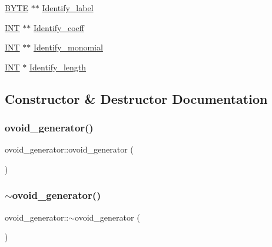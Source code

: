 \begin{DoxyCompactItemize}
\item 
\mbox{\hyperlink{galois_8h_ab6cc7b4aeb6ea31aba2b3fbfc83ff5e6}{B\+Y\+TE}} $\ast$$\ast$ \mbox{\hyperlink{classovoid__generator_aa6f6781633bb6e8a7113528d3408500d}{Identify\+\_\+label}}
\item 
\mbox{\hyperlink{galois_8h_a09fddde158a3a20bd2dcadb609de11dc}{I\+NT}} $\ast$$\ast$ \mbox{\hyperlink{classovoid__generator_a4db18ba0a00ae839f161478f60e8a7d4}{Identify\+\_\+coeff}}
\item 
\mbox{\hyperlink{galois_8h_a09fddde158a3a20bd2dcadb609de11dc}{I\+NT}} $\ast$$\ast$ \mbox{\hyperlink{classovoid__generator_ac3e236bc9788367ae8699f291bcb8e8e}{Identify\+\_\+monomial}}
\item 
\mbox{\hyperlink{galois_8h_a09fddde158a3a20bd2dcadb609de11dc}{I\+NT}} $\ast$ \mbox{\hyperlink{classovoid__generator_a4cb915a0e2e651b550e943dc7976385e}{Identify\+\_\+length}}
\end{DoxyCompactItemize}


\subsection{Constructor \& Destructor Documentation}
\mbox{\label{classovoid__generator_a22cb69fdb7022c68d3bf3c32ca74ec70}} 
\subsubsection{\texorpdfstring{ovoid\+\_\+generator()}{ovoid\_generator()}}
{\footnotesize\ttfamily ovoid\+\_\+generator\+::ovoid\+\_\+generator (\begin{DoxyParamCaption}{ }\end{DoxyParamCaption})}

\mbox{\label{classovoid__generator_a383548cbaaa7b6aae96a2663a871ab72}} 
\subsubsection{\texorpdfstring{$\sim$ovoid\+\_\+generator()}{~ovoid\_generator()}}
{\footnotesize\ttfamily ovoid\+\_\+generator\+::$\sim$ovoid\+\_\+generator (\begin{DoxyParamCaption}{ }\end{DoxyParamCaption})}



